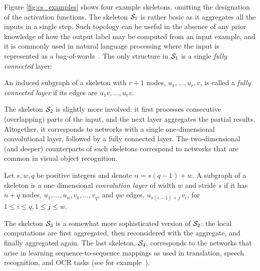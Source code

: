 Figure \ref{fig:cs_examples} shows four example skeletons, omitting
the designation of the activation functions. The skeleton
${\cal S}_1$ is rather basic as it aggregates all the inputs in a single
step. Such topology can be useful in the absence of any prior
knowledge of how the output label may be computed from an input example, and
it is commonly used in natural language processing where the input is
represented as a bag-of-words~\cite{harris1954distributional}. The only structure in ${\cal S}_1$
is a single {\em fully connected} layer:
\begin{terminology}
%
An induced subgraph of a skeleton with $r+1$ nodes, $u_1,\ldots,u_r,v$, is
called a {\em fully connected layer} if its edges are
$u_1v,\ldots,u_rv$.
%
\end{terminology}
The skeleton ${\cal S}_2$ is slightly more involved: it first processes
consecutive (overlapping) parts of the input, and the next layer
aggregates the partial results. Altogether, it corresponds to networks
with a single one-dimensional convolutional layer, followed by a fully
connected layer. The two-dimensional (and deeper) counterparts of such skeletons
correspond to networks that are common in visual object recognition.
\begin{terminology}
%
Let $s,w,q$ be positive integers and denote $n=s(q-1)+w$. A subgraph
of a skeleton is a one dimensional {\em convolution layer} of width $w$ and stride $s$
if it has $n+q$ nodes, $u_1,\ldots,u_{n}, v_1,\ldots,v_q$, and $q w$ edges,
$u_{s(i-1)+j}\,v_{i}$, for $1\le i\le q,1\le j\le w$.
%
\end{terminology}
The skeleton ${\cal S}_3$ is a somewhat more sophisticated version of ${\cal S}_2$: the local computations are first aggregated, then reconsidered with the aggregate, and finally aggregated again.
%
The last skeleton, ${\cal S}_4$, corresponds to the networks that arise in
learning sequence-to-sequence mappings as used in translation, speech
recognition, and OCR tasks (see for example~\citet{sutskever2014sequence}).

